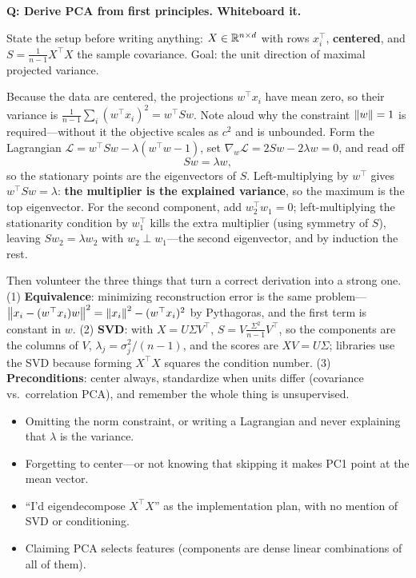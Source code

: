\begin{interviewq}
\textbf{Q: Derive PCA from first principles. Whiteboard it.}

 \quad {} \quad \badgefreq{\freqhigh}

\stronganswer

State the setup before writing anything: $X \in \mathbb{R}^{n\times d}$ with rows $x_i^\top$, \textbf{centered}, and $S = \frac{1}{n-1}X^\top X$ the sample covariance. Goal: the unit direction of maximal projected variance.

Because the data are centered, the projections $w^\top x_i$ have mean zero, so their variance is $\frac{1}{n-1}\sum_i (w^\top x_i)^2 = w^\top S w$. Note aloud why the constraint $\left\lVert w\right\rVert=1$ is required---without it the objective scales as $c^2$ and is unbounded. Form the Lagrangian $\mathcal{L} = w^\top S w - \lambda(w^\top w - 1)$, set $\nabla_w \mathcal{L} = 2Sw - 2\lambda w = 0$, and read off
\begin{equation*}
S w = \lambda w ,
\end{equation*}
so the stationary points are the eigenvectors of $S$. Left-multiplying by $w^\top$ gives $w^\top S w = \lambda$: \textbf{the multiplier is the explained variance}, so the maximum is the top eigenvector. For the second component, add $w_2^\top w_1 = 0$; left-multiplying the stationarity condition by $w_1^\top$ kills the extra multiplier (using symmetry of $S$), leaving $Sw_2 = \lambda w_2$ with $w_2 \perp w_1$---the second eigenvector, and by induction the rest.

Then volunteer the three things that turn a correct derivation into a strong one. (1) \textbf{Equivalence}: minimizing reconstruction error is the same problem---$\left\lVert x_i - (w^\top x_i)w\right\rVert^2 = \left\lVert x_i\right\rVert^2 - (w^\top x_i)^2$ by Pythagoras, and the first term is constant in $w$. (2) \textbf{SVD}: with $X = U\Sigma V^\top$, $S = V\frac{\Sigma^2}{n-1}V^\top$, so the components are the columns of $V$, $\lambda_j = \sigma_j^2/(n-1)$, and the scores are $XV = U\Sigma$; libraries use the SVD because forming $X^\top X$ squares the condition number. (3) \textbf{Preconditions}: center always, standardize when units differ (covariance vs.\ correlation PCA), and remember the whole thing is unsupervised.

\redflags
\begin{itemize}
    \item Omitting the norm constraint, or writing a Lagrangian and never explaining that $\lambda$ is the variance.
    \item Forgetting to center---or not knowing that skipping it makes PC1 point at the mean vector.
    \item ``I'd eigendecompose $X^\top X$'' as the implementation plan, with no mention of SVD or conditioning.
    \item Claiming PCA selects features (components are dense linear combinations of all of them).
\end{itemize}


\end{interviewq}

